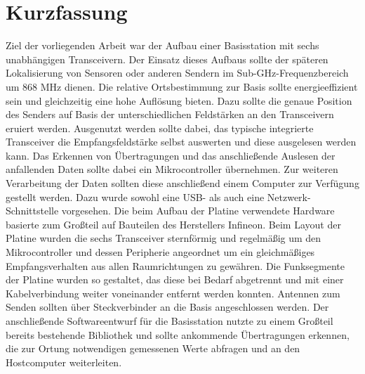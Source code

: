 
\chapter*{Kurzfassung}
\label{sec:kurzfassung}
\pagestyle{scrheadings}

Ziel der vorliegenden Arbeit war der Aufbau einer Basisstation mit sechs unabhängigen Transceivern. Der Einsatz dieses Aufbaus sollte der späteren Lokalisierung von Sensoren oder anderen Sendern im Sub-GHz-Frequenzbereich um 868 MHz dienen. Die relative Ortsbestimmung zur Basis sollte energieeffizient sein und gleichzeitig eine hohe Auflösung bieten. 
Dazu sollte die genaue Position des Senders auf Basis der unterschiedlichen Feldstärken an den Transceivern eruiert werden. Ausgenutzt werden sollte dabei, das typische integrierte Transceiver die Empfangsfeldstärke selbst auswerten und diese ausgelesen werden kann. Das Erkennen von Übertragungen und das anschließende Auslesen der anfallenden Daten sollte dabei ein Mikrocontroller übernehmen. Zur weiteren Verarbeitung der Daten sollten diese anschließend einem Computer zur Verfügung gestellt werden. Dazu wurde sowohl eine USB- als auch eine Netzwerk-Schnittstelle vorgesehen. Die beim Aufbau der Platine verwendete Hardware basierte zum Großteil auf Bauteilen des Herstellers Infineon. 
Beim Layout der Platine wurden die sechs Transceiver sternförmig und regelmäßig um den Mikrocontroller und dessen Peripherie angeordnet um ein gleichmäßiges Empfangsverhalten aus allen Raumrichtungen zu gewähren. Die Funksegmente der Platine wurden so gestaltet, das diese bei Bedarf abgetrennt und mit einer Kabelverbindung weiter voneinander entfernt werden konnten. Antennen zum Senden sollten über Steckverbinder an die Basis angeschlossen werden.
Der anschließende Softwareentwurf für die Basisstation nutzte zu einem Großteil bereits bestehende Bibliothek und sollte ankommende Übertragungen erkennen, die zur Ortung notwendigen gemessenen Werte abfragen und an den Hostcomputer weiterleiten. 


